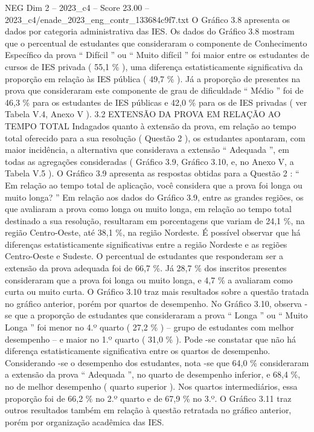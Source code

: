 \begin{textsample}{NEG Dim 2 – 2023\_c4 – Score 23.00 – 2023\_c4/enade\_2023\_eng\_contr\_133684c9f7.txt}
O Gráfico 3.8 apresenta os dados por categoria administrativa das IES.
Os dados do Gráfico 3.8 mostram que o percentual de estudantes que consideraram o componente de Conhecimento Específico da prova “ Difícil ” ou “ Muito difícil ” foi maior entre os estudantes de cursos de IES privada ( 55,1 \% ), uma diferença estatisticamente significativa da proporção em relação às IES pública ( 49,7 \% ).
Já a proporção de presentes na prova que consideraram este componente de grau de dificuldade “ Médio ” foi de 46,3 \% para os estudantes de IES públicas e 42,0 \% para os de IES privadas ( ver Tabela V.4, Anexo V ). 3.2 EXTENSÃO DA PROVA EM RELAÇÃO AO TEMPO TOTAL Indagados quanto à extensão da prova, em relação ao tempo total oferecido para a sua resolução ( Questão 2 ), os estudantes apontaram, com maior incidência, a alternativa que considerava a extensão “ Adequada ”, em todas as agregações consideradas ( Gráfico 3.9, Gráfico 3.10, e, no Anexo V, a Tabela V.5 ).
O Gráfico 3.9 apresenta as respostas obtidas para a Questão 2 : “ Em relação ao tempo total de aplicação, você considera que a prova foi longa ou muito longa? ” Em relação aos dados do Gráfico 3.9, entre as grandes regiões, os que avaliaram a prova como longa ou muito longa, em relação ao tempo total destinado a sua resolução, resultaram em porcentagens que variam de 24,1 \%, na região Centro-Oeste, até 38,1 \%, na região Nordeste.
É possível observar que há diferenças estatisticamente significativas entre a região Nordeste e as regiões Centro-Oeste e Sudeste.
O percentual de estudantes que responderam ser a extensão da prova adequada foi de 66,7 \%.
Já 28,7 \% dos inscritos presentes consideraram que a prova foi longa ou muito longa, e 4,7 \% a avaliaram como curta ou muito curta.
O Gráfico 3.10 traz mais resultados sobre a questão tratada no gráfico anterior, porém por quartos de desempenho.
No Gráfico 3.10, observa -se que a proporção de estudantes que consideraram a prova “ Longa ” ou “ Muito Longa ” foi menor no 4.º quarto ( 27,2 \% ) – grupo de estudantes com melhor desempenho – e maior no 1.º quarto ( 31,0 \% ).
Pode -se constatar que não há diferença estatisticamente significativa entre os quartos de desempenho.
Considerando -se o desempenho dos estudantes, nota -se que 64,0 \% consideraram a extensão da prova “ Adequada ”, no quarto de desempenho inferior, e 68,4 \%, no de melhor desempenho ( quarto superior ).
Nos quartos intermediários, essa proporção foi de 66,2 \% no 2.º quarto e de 67,9 \% no 3.º.
O Gráfico 3.11 traz outros resultados também em relação à questão retratada no gráfico anterior, porém por organização acadêmica das IES.

\end{textsample}
